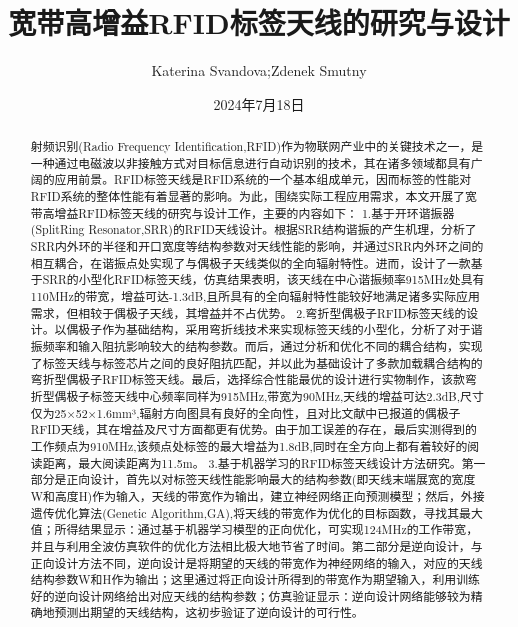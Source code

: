 \documentclass{article}
\title{宽带高增益RFID标签天线的研究与设计}
\author{Katerina Svandova;Zdenek Smutny}
\date{2024年7月18日}
\begin{document}
	
	\maketitle
	
	\begin{abstract}
	射频识别(Radio Frequency Identification,RFID)作为物联网产业中的关键技术之一，是一种通过电磁波以非接触方式对目标信息进行自动识别的技术，其在诸多领域都具有广阔的应用前景。RFID标签天线是RFID系统的一个基本组成单元，因而标签的性能对RFID系统的整体性能有着显著的影响。为此，围绕实际工程应用需求，本文开展了宽带高增益RFID标签天线的研究与设计工作，主要的内容如下：
	1.基于开环谐振器(SplitRing Resonator,SRR)的RFID天线设计。根据SRR结构谐振的产生机理，分析了SRR内外环的半径和开口宽度等结构参数对天线性能的影响，并通过SRR内外环之间的相互耦合，在谐振点处实现了与偶极子天线类似的全向辐射特性。进而，设计了一款基于SRR的小型化RFID标签天线，仿真结果表明，该天线在中心谐振频率915MHz处具有110MHz的带宽，增益可达-1.3dB,且所具有的全向辐射特性能较好地满足诸多实际应用需求，但相较于偶极子天线，其增益并不占优势。
	2.弯折型偶极子RFID标签天线的设计。以偶极子作为基础结构，采用弯折线技术来实现标签天线的小型化，分析了对于谐振频率和输入阻抗影响较大的结构参数。而后，通过分析和优化不同的耦合结构，实现了标签天线与标签芯片之间的良好阻抗匹配，并以此为基础设计了多款加载耦合结构的弯折型偶极子RFID标签天线。最后，选择综合性能最优的设计进行实物制作，该款弯折型偶极子标签天线中心频率同样为915MHz,带宽为90MHz,天线的增益可达2.3dB,尺寸仅为25×52×1.6mm³,辐射方向图具有良好的全向性，且对比文献中已报道的偶极子RFID天线，其在增益及尺寸方面都更有优势。由于加工误差的存在，最后实测得到的工作频点为910MHz,该频点处标签的最大增益为1.8dB,同时在全方向上都有着较好的阅读距离，最大阅读距离为11.5m。
	3.基于机器学习的RFID标签天线设计方法研究。第一部分是正向设计，首先以对标签天线性能影响最大的结构参数(即天线末端展宽的宽度W和高度H)作为输入，天线的带宽作为输出，建立神经网络正向预测模型；然后，外接遗传优化算法(Genetic Algorithm,GA),将天线的带宽作为优化的目标函数，寻找其最大值；所得结果显示：通过基于机器学习模型的正向优化，可实现124MHz的工作带宽，并且与利用全波仿真软件的优化方法相比极大地节省了时间。第二部分是逆向设计，与正向设计方法不同，逆向设计是将期望的天线的带宽作为神经网络的输入，对应的天线结构参数W和H作为输出；这里通过将正向设计所得到的带宽作为期望输入，利用训练好的逆向设计网络给出对应天线的结构参数；仿真验证显示：逆向设计网络能够较为精确地预测出期望的天线结构，这初步验证了逆向设计的可行性。
	\end{abstract}
	
\end{document}
